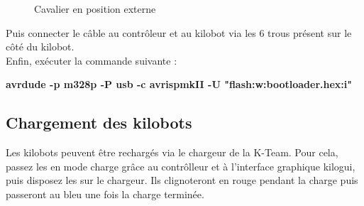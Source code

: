 \documentclass[a4paper,8pt]{report}
\begin{document}
\begin{figure}[!h]
    \centering
    \caption{Cavalier en position externe}
\end{figure}

Puis connecter le c\^able au contr\^oleur et au kilobot via les 6 trous pr\'esent sur le c\^ot\'e du kilobot.\\
Enfin, ex\'ecuter la commande suivante :\\

\begin{center}
  \textbf{avrdude -p m328p -P usb -c avrispmkII -U "flash:w:bootloader.hex:i"}
\end{center}

\smallskip
\begin{center}
\end{center}

\newpage
\subsection*{Chargement des kilobots}\label{sec:name}

Les kilobots peuvent être rechargés via le chargeur de la K-Team. Pour cela, passez les en mode charge grâce au contrôlleur et à l'interface graphique kilogui, puis disposez les sur le chargeur. Ils clignoteront en rouge pendant la charge puis passeront au bleu une fois la charge terminée.
\end{document}
